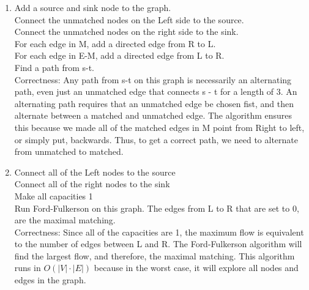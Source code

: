 \documentclass[11pt]{article}
\begin{document}
\begin{enumerate}
\begin{enumerate}
\item
Add a source and sink node to the graph.\\
Connect the unmatched nodes on the Left side to the source.\\
Connect the unmatched nodes on the right side to the sink.\\
For each edge in M, add a directed edge from R to L.\\
For each edge in E-M, add a directed edge from L to R.\\
Find a path from s-t.\\
Correctness: Any path from s-t on this graph is necessarily an alternating path, even just an unmatched edge that connects s - t for a length of 3. An alternating path requires that an unmatched edge be chosen fist, and then alternate between a matched and unmatched edge. The algorithm ensures this because we made all of the matched edges in M point from Right to left, or simply put, backwards. Thus, to get a correct path, we need to alternate from unmatched to matched.\\ 
\item
Connect all of the Left nodes to the source\\
Connect all of the right nodes to the sink\\
Make all capacities 1\\
Run Ford-Fulkerson on this graph.
The edges from L to R that are set to 0, are the maximal matching.\\
Correctness: Since all of the capacities are 1, the maximum flow is equivalent to the number of edges between L and R. The Ford-Fulkerson algorithm will find the largest flow, and therefore, the maximal matching. This algorithm runs in $O(|V| \cdot |E|)$ because in the worst case, it will explore all nodes and edges in the graph.
\end{enumerate}


\end{enumerate}
\end{document}
